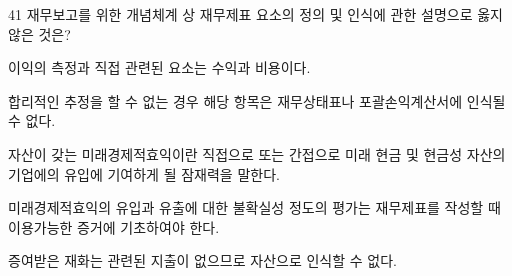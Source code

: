 \begin{question}{41}
재무보고를 위한 개념체계 상 재무제표 요소의 정의 및 인식에 관한 설명으로 옳지 않은 것은?
\begin{choices}
  \item 이익의 측정과 직접 관련된 요소는 수익과 비용이다.
  \item 합리적인 추정을 할 수 없는 경우 해당 항목은 재무상태표나 포괄손익계산서에 인식될 수 없다.
  \item 자산이 갖는 미래경제적효익이란 직접으로 또는 간접으로 미래 현금 및 현금성 자산의 기업에의 유입에 기여하게 될 잠재력을 말한다.
  \item 미래경제적효익의 유입과 유출에 대한 불확실성 정도의 평가는 재무제표를 작성할 때 이용가능한 증거에 기초하여야 한다.
  \item 증여받은 재화는 관련된 지출이 없으므로 자산으로 인식할 수 없다.
\end{choices}
\end{question}
